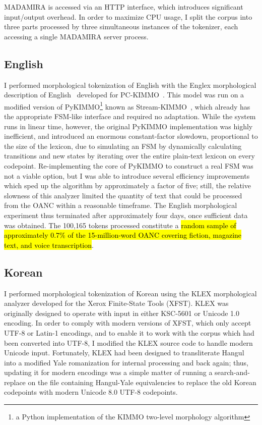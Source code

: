 MADAMIRA is accessed via an HTTP interface, which introduces significant input/output overhead. In order to maximize CPU usage, I split the corpus into three parts processed by three simultaneous instances of the tokenizer, each accessing a single MADAMIRA server process.

\subsection{English}
I performed morphological tokenization of English with the Englex morphological description of English~\cite{antworthenglex} developed for PC-KIMMO~\cite{koskenniemi84}. This model was run on a modified version of PyKIMMO\footnote{a Python implementation of the KIMMO two-level morphology algorithm} known as Stream-KIMMO~\cite{kearsley13}, which already has the appropriate FSM-like interface and required no adaptation. While the system runs in linear time, however, the original PyKIMMO implementation was highly inefficient, and introduced an enormous constant-factor slowdown, proportional to the size of the lexicon, due to simulating an FSM by dynamically calculating transitions and new states by iterating over the entire plain-text lexicon on every codepoint. Re-implementing the core of PyKIMMO to construct a real FSM was not a viable option, but I was able to introduce several efficiency improvements which sped up the algorithm by approximately a factor of five; still, the relative slowness of this analyzer limited the quantity of text that could be processed from the OANC within a reasonable timeframe. The English morphological experiment thus terminated after approximately four days, once sufficient data was obtained. The 100,165 tokens processed constitute a \hl{random sample of approximately 0.7\% of the 15-million-word OANC covering fiction, magazine text, and voice transcription}.

\subsection{Korean}
I performed morphological tokenization of Korean using the KLEX morphological analyzer developed for the Xerox Finite-State Tools (XFST). KLEX was originally designed to operate with input in either KSC-5601 or Unicode 1.0 encoding. In order to comply with modern versions of XFST, which only accept UTF-8 or Latin-1 encodings, and to enable it to work with the corpus which had been converted into UTF-8, I modified the KLEX source code to handle modern Unicode input. Fortunately, KLEX had been designed to transliterate Hangul into a modified Yale romanization for internal processing and back again; thus, updating it for modern encodings was a simple matter of running a search-and-replace on the file containing Hangul-Yale equivalencies to replace the old Korean codepoints with modern Unicode 8.0 UTF-8 codepoints.

